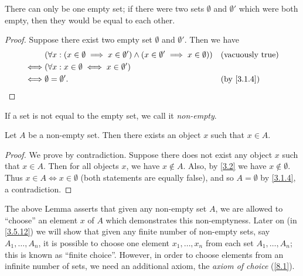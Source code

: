 \begin{ac}\label{ac:3.1.2}
  There can only be one empty set;
  if there were two sets \(\emptyset\) and \(\emptyset'\) which were both empty, then they would be equal to each other.
\end{ac}

\begin{proof}
  Suppose there exist two empty set \(\emptyset\) and \(\emptyset'\).
  Then we have
  \begin{align*}
         & (\forall x : (x \in \emptyset \implies x \in \emptyset') \land (x \in \emptyset' \implies x \in \emptyset)) &  & \text{(vacuously true)}  \\
    \iff & (\forall x : x \in \emptyset \iff x \in \emptyset')                                                                                       \\
    \iff & \emptyset = \emptyset'.                                                                                     &  & \text{(by \cref{3.1.4})}
  \end{align*}
\end{proof}

\begin{note}
  If a set is not equal to the empty set, we call it \emph{non-empty}.
\end{note}

\setcounter{thm}{5}
\begin{lem}\label{3.1.6}
  Let \(A\) be a non-empty set.
  Then there exists an object \(x\) such that \(x \in A\).
\end{lem}

\begin{proof}
  We prove by contradiction.
  Suppose there does not exist any object \(x\) such that \(x \in A\).
  Then for all objects \(x\), we have \(x \notin A\).
  Also, by \cref{3.2} we have \(x \notin \emptyset\).
  Thus \(x \in A \iff x \in \emptyset\) (both statements are equally false), and so \(A = \emptyset\) by \cref{3.1.4}, a contradiction.
\end{proof}

\begin{rmk}\label{3.1.7}
  The above Lemma asserts that given any non-empty set \(A\), we are allowed to ``choose'' an element \(x\) of \(A\) which demonstrates this non-emptyness.
  Later on (in \cref{3.5.12}) we will show that given any finite number of non-empty sets, say \(A_1, \dots, A_n\), it is possible to choose one element \(x_1, \dots, x_n\) from each set \(A_1, \dots, A_n\);
  this is known as ``finite choice''.
  However, in order to choose elements from an infinite number of sets, we need an additional axiom, the \emph{axiom of choice} (\cref{8.1}).
\end{rmk}


